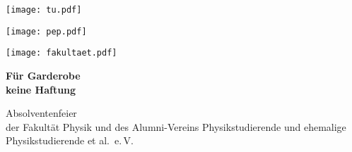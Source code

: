 \documentclass[paper=landscape]{scrartcl}
\begin{document}
\begin{minipage}{0.44\textwidth}%
  \texttt{[image: tu.pdf]}%
\end{minipage}%
\begin{minipage}{0.25\textwidth}%
  \centering
  \texttt{[image: pep.pdf]}%
\end{minipage}%
\begin{minipage}{0.29\textwidth}%
  \raggedleft%
  \texttt{[image: fakultaet.pdf]}%
\end{minipage}%

\vfill

\begin{center}
  \fontsize{100}{120}\selectfont\bfseries%
  Für Garderobe\\
  keine Haftung
\end{center}

\vfill

\begin{center}
  \huge Absolventenfeier\\
  der Fakultät Physik und des Alumni-Vereins
  Physikstudierende und ehemalige Physikstudierende et al.\ e.\,V.
\end{center}
  
\end{document}
